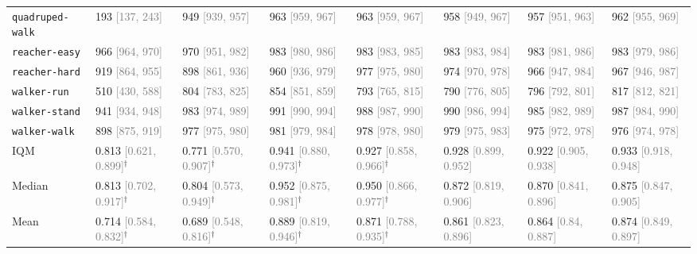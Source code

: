 \begin{table}[h]
{{\begin{tabular}{llllllll}
\texttt{quadruped-walk} & 193 \textcolor{gray}{[137, 243]} & 949 \textcolor{gray}{[939, 957]} & 963 \textcolor{gray}{[959, 967]} & 963 \textcolor{gray}{[959, 967]} & 958 \textcolor{gray}{[949, 967]} & 957 \textcolor{gray}{[951, 963]} & 962 \textcolor{gray}{[955, 969]} \\
\texttt{reacher-easy} & 966 \textcolor{gray}{[964, 970]} & 970 \textcolor{gray}{[951, 982]} & 983 \textcolor{gray}{[980, 986]} & 983 \textcolor{gray}{[983, 985]} & 983 \textcolor{gray}{[983, 984]} & 983 \textcolor{gray}{[981, 986]} & 983 \textcolor{gray}{[979, 986]} \\
\texttt{reacher-hard} & 919 \textcolor{gray}{[864, 955]} & 898 \textcolor{gray}{[861, 936]} & 960 \textcolor{gray}{[936, 979]} & 977 \textcolor{gray}{[975, 980]} & 974 \textcolor{gray}{[970, 978]} & 966 \textcolor{gray}{[947, 984]} & 967 \textcolor{gray}{[946, 987]} \\
\texttt{walker-run} & 510 \textcolor{gray}{[430, 588]} & 804 \textcolor{gray}{[783, 825]} & 854 \textcolor{gray}{[851, 859]} & 793 \textcolor{gray}{[765, 815]} & 790 \textcolor{gray}{[776, 805]} & 796 \textcolor{gray}{[792, 801]} & 817 \textcolor{gray}{[812, 821]} \\
\texttt{walker-stand} & 941 \textcolor{gray}{[934, 948]} & 983 \textcolor{gray}{[974, 989]} & 991 \textcolor{gray}{[990, 994]} & 988 \textcolor{gray}{[987, 990]} & 990 \textcolor{gray}{[986, 994]} & 985 \textcolor{gray}{[982, 989]} & 987 \textcolor{gray}{[984, 990]} \\
\texttt{walker-walk} & 898 \textcolor{gray}{[875, 919]} & 977 \textcolor{gray}{[975, 980]} & 981 \textcolor{gray}{[979, 984]} & 978 \textcolor{gray}{[978, 980]} & 979 \textcolor{gray}{[975, 983]} & 975 \textcolor{gray}{[972, 978]} & 976 \textcolor{gray}{[974, 978]} \\ \midrule
IQM & 0.813 \textcolor{gray}{[0.621, 0.899]}$^\dagger$ & 0.771 \textcolor{gray}{[0.570, 0.907]}$^\dagger$ & 0.941 \textcolor{gray}{[0.880, 0.973]}$^\dagger$ & 0.927 \textcolor{gray}{[0.858, 0.966]}$^\dagger$ & 0.928 \textcolor{gray}{[0.899, 0.952]} & 0.922 \textcolor{gray}{[0.905, 0.938]} & 0.933 \textcolor{gray}{[0.918, 0.948]}  \\
Median & 0.813 \textcolor{gray}{[0.702, 0.917]}$^\dagger$
 & 0.804 \textcolor{gray}{[0.573, 0.949]}$^\dagger$ & 0.952 \textcolor{gray}{[0.875, 0.981]}$^\dagger$ & 0.950 \textcolor{gray}{[0.866, 0.977]}$^\dagger$ & 0.872 \textcolor{gray}{[0.819, 0.906]} & 0.870 \textcolor{gray}{[0.841, 0.896]} & 0.875 \textcolor{gray}{[0.847, 0.905]}  \\
Mean & 0.714 \textcolor{gray}{[0.584, 0.832]}$^\dagger$ & 0.689 \textcolor{gray}{[0.548, 0.816]}$^\dagger$ & 0.889 \textcolor{gray}{[0.819, 0.946]}$^\dagger$ & 0.871 \textcolor{gray}{[0.788, 0.935]}$^\dagger$ & 0.861 \textcolor{gray}{[0.823, 0.896]} & 0.864 \textcolor{gray}{[0.84, 0.887]} & 0.874 \textcolor{gray}{[0.849, 0.897]} \\
\bottomrule
\end{tabular}}
}
\end{table}